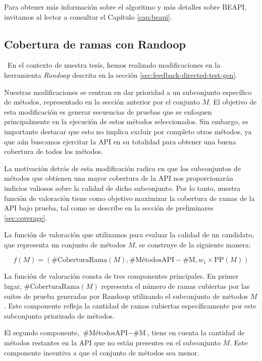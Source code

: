 Para obtener más información sobre el algoritmo y más detalles sobre BEAPI, invitamos al lector a consultar el Capítulo \ref{cap:beapi}.


\subsection{Cobertura de ramas con Randoop}
\
En el contexto de nuestra tesis, hemos realizado modificaciones en la herramienta \emph{Randoop} descrita en la sección \ref{sec:feedback-directed-test-gen}.

Nuestras modificaciones se centran en dar prioridad a un subconjunto específico de métodos, representado en la sección anterior por el conjunto $M$. El objetivo de esta modificación es generar secuencias de pruebas que se enfoquen principalmente en la ejecución de estos métodos seleccionados. Sin embargo, es importante destacar que esto no implica excluir por completo otros métodos, ya que aún buscamos ejercitar la API en su totalidad para obtener una buena cobertura de todos los métodos.

La motivación detrás de esta modificación radica en que los subconjuntos de métodos que obtienen una mayor cobertura de la API nos proporcionarán indicios valiosos sobre la calidad de dicho subconjunto. Por lo tanto, nuestra función de valoración tiene como objetivo maximizar la cobertura de ramas de la API bajo prueba, tal como se describe en la sección de preliminares \ref{sec:coverage}.

La función de valoración que utilizamos para evaluar la calidad de un candidato, que representa un conjunto de métodos $M$, se construye de la siguiente manera:

\begin{equation*}
f(M) = (\text{{\#CoberturaRama}}(M), \text{{\#MétodosAPI}} - \text{{\#M}}, w_1 \times \text{{PP}}(M))
\end{equation*}

La función de valoración consta de tres componentes principales. En primer lugar, $\text{{\#CoberturaRama}}(M)$ representa el número de ramas cubiertas por las suites de prueba generadas por Randoop utilizando el subconjunto de métodos $M$. Este componente refleja la cantidad de ramas cubiertas específicamente por este subconjunto priorizado de métodos.

El segundo componente, $\text{{\#MétodosAPI}} - \text{{\#M}}$, tiene en cuenta la cantidad de métodos restantes en la API que no están presentes en el subconjunto $M$. Este componente incentiva a que el conjunto de métodos sea menor.

